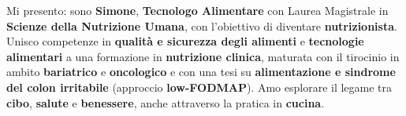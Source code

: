 \documentclass[10pt,a4paper]{altacv}
\begin{document}
Mi presento: sono \textbf{Simone}, \textbf{Tecnologo Alimentare} con Laurea Magistrale in \textbf{Scienze della Nutrizione Umana}, con l’obiettivo di diventare \textbf{nutrizionista}. Unisco competenze in \textbf{qualità e sicurezza degli alimenti} e \textbf{tecnologie alimentari} a una formazione in \textbf{nutrizione clinica}, maturata con il tirocinio in ambito \textbf{bariatrico} e \textbf{oncologico} e con una tesi su \textbf{alimentazione e sindrome del colon irritabile} (approccio \textbf{low-FODMAP}). Amo esplorare il legame tra \textbf{cibo}, \textbf{salute} e \textbf{benessere}, anche attraverso la pratica in \textbf{cucina}.






\end{document}
